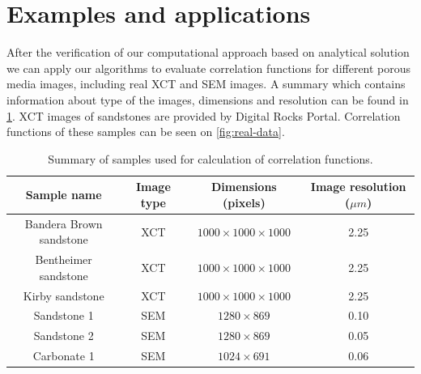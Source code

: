 \documentclass[reprint,amsmath,amssymb,aps,pre,showkeys,showpacs,nofootinbib]{revtex4-1}
\begin{document}
\section{Examples and applications}
\label{sec:examples}
After the verification of our computational approach based on analytical
solution we can apply our algorithms to evaluate correlation functions for
different porous media images, including real XCT and SEM images. A summary
which contains information about type of the images, dimensions and resolution
can be found in \cref{tab:samples}. XCT images of sandstones are provided by
Digital Rocks Portal\cite{DigitalRocks}. Correlation functions of these samples
can be seen on \cref{fig:real-data}.

\begin{table}[!pt]
  \centering
  \begin{ruledtabular}
    \begin{tabular}{|c|c|c|c|}
      Sample name & Image type & Dimensions (pixels) & Image resolution ($\mu m$) \\
      \hline
      Bandera Brown sandstone & XCT & $1000 \times 1000 \times 1000$ & 2.25 \\
      Bentheimer sandstone    & XCT & $1000 \times 1000 \times 1000$ & 2.25 \\
      Kirby sandstone         & XCT & $1000 \times 1000 \times 1000$ & 2.25 \\
      Sandstone 1 & SEM &  $1280 \times 869$ & 0.10 \\
      Sandstone 2 & SEM &  $1280 \times 869$ & 0.05 \\
      Carbonate 1 & SEM &  $1024 \times 691$ & 0.06
    \end{tabular}
  \end{ruledtabular}
  \caption{Summary of samples used for calculation of correlation functions.}
  \label{tab:samples}
\end{table}
\end{document}
